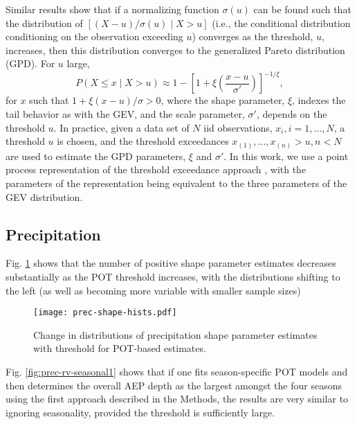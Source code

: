 \documentclass{ametsocV6.1}
\begin{document}
Similar results show that if a normalizing function $\sigma(u)$ can be found such that the distribution of $[(X - u)/\sigma(u) \mid X > u]$ (i.e., the conditional distribution conditioning on the observation exceeding $u$) converges as the threshold, $u$, increases, then this distribution converges to the generalized Pareto distribution (GPD).
For $u$ large, 
\begin{equation}
\label{eq:GPD}
P(X \leq x \mid X > u) \approx 1 - \left[1 + \xi \left( \frac{x - u}{\sigma'} \right) \right]^{-1/\xi},
\end{equation}
for $x$ such that $1 + \xi ( x - u)/\sigma > 0$, where the shape parameter, $\xi$, indexes the tail behavior as with the GEV, and the scale parameter, $\sigma'$, depends on the threshold $u$.
In practice, given a data set of $N$ iid observations, $x_i, i = 1, \ldots, N$, a threshold $u$ is chosen, and the threshold exceedances $x_{(1)}, \ldots, x_{(n)} > u, n < N$ are used to estimate the GPD parameters, $\xi$ and $\sigma'$. In this work, we use a point process representation of the threshold exceedance approach \citep[Section 7]{smith1989extreme,coles2001introduction}, with the parameters of the representation being equivalent to the three parameters of the GEV distribution.

\clearpage
\appendix[B]
\label{app-figs}

\subsection*{Precipitation}

Fig. \ref{fig:prec-shape-hists} shows
that the number of positive shape parameter estimates decreases substantially as the POT threshold increases, with the distributions shifting to the left (as well as becoming more variable with smaller sample sizes)

\begin{figure}[H]
    \centering
    \texttt{[image: prec-shape-hists.pdf]}
    \caption{Change in distributions of precipitation shape parameter estimates with threshold for POT-based estimates.}
    \label{fig:prec-shape-hists}
\end{figure}

Fig. \ref{fig:prec-rv-seasonal1} shows that if one fits season-specific POT models and then determines the overall AEP depth as the largest amongst the four seasons using the first approach described in the Methods, the results are very similar to ignoring seasonality, provided the threshold is sufficiently large.
\end{document}
